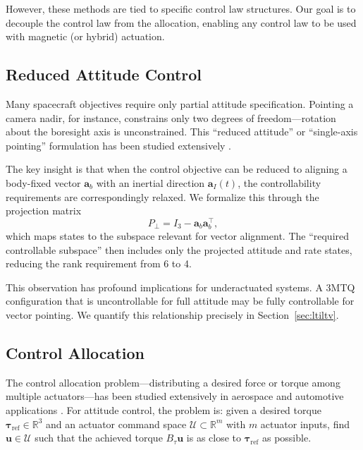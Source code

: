 \documentclass[conference]{IEEEtran}
\begin{document}
However, these methods are tied to specific control law structures. Our goal is to decouple the control law from the allocation, enabling any control law to be used with magnetic (or hybrid) actuation.

\subsection{Reduced Attitude Control}\label{subsec:reduced_attitude}
Many spacecraft objectives require only partial attitude specification. Pointing a camera nadir, for instance, constrains only two degrees of freedom---rotation about the boresight axis is unconstrained. This ``reduced attitude'' or ``single-axis pointing'' formulation has been studied extensively \cite{hu_reduced_2019, pong_reduced-attitude_2015, bullo_control_1995}.

The key insight is that when the control objective can be reduced to aligning a body-fixed vector $\mathbf{a}_b$ with an inertial direction $\mathbf{a}_I(t)$, the controllability requirements are correspondingly relaxed. We formalize this through the projection matrix
\begin{equation}
P_\perp = I_3 - \mathbf{a}_b \mathbf{a}_b^\top,
\end{equation}
which maps states to the subspace relevant for vector alignment. The ``required controllable subspace'' then includes only the projected attitude and rate states, reducing the rank requirement from 6 to 4.

This observation has profound implications for underactuated systems. A 3MTQ configuration that is uncontrollable for full attitude may be fully controllable for vector pointing. We quantify this relationship precisely in Section~\ref{sec:ltiltv}.

\subsection{Control Allocation}
The control allocation problem---distributing a desired force or torque among multiple actuators---has been studied extensively in aerospace and automotive applications \cite{johansen_control_2013}. For attitude control, the problem is: given a desired torque $\boldsymbol{\tau}_{\text{ref}} \in \mathbb{R}^3$ and an actuator command space $\mathcal{U} \subset \mathbb{R}^m$ with $m$ actuator inputs, find $\mathbf{u} \in \mathcal{U}$ such that the achieved torque $B_\tau \mathbf{u}$ is as close to $\boldsymbol{\tau}_{\text{ref}}$ as possible.
\end{document}
